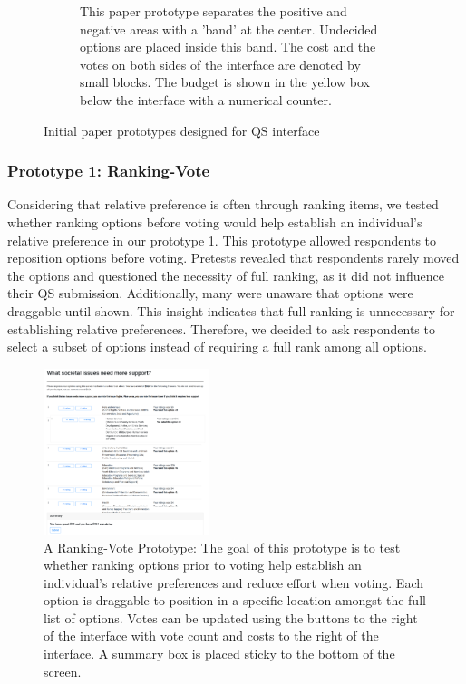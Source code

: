 \begin{figure}[H]
\begin{subfigure}[b]{0.42\textwidth}
        \caption{This paper prototype separates the positive and negative areas with a 'band' at the center. Undecided options are placed inside this band. The cost and the votes on both sides of the interface are denoted by small blocks. The budget is shown in the yellow box below the interface with a numerical counter.}
        \label{fig:vertical_paper}
    \end{subfigure}
    \caption{Initial paper prototypes designed for QS interface}
    \label{fig:qv_paper}
\end{figure}

\subsubsection{Prototype 1: Ranking-Vote}
Considering that relative preference is often through ranking items, we tested whether ranking options before voting would help establish an individual's relative preference in our prototype 1. This prototype allowed respondents to reposition options before voting. Pretests revealed that respondents rarely moved the options and questioned the necessity of full ranking, as it did not influence their QS submission. Additionally, many were unaware that options were draggable until shown. This insight indicates that full ranking is unnecessary for establishing relative preferences. Therefore, we decided to ask respondents to select a subset of options instead of requiring a full rank among all options.

\begin{figure}[h]
    \centering
    \includegraphics[width=0.43\textwidth]{content/image/prototypes/2_ranking.png}
    \caption{A Ranking-Vote Prototype: The goal of this prototype is to test whether ranking options prior to voting help establish an individual's relative preferences and reduce effort when voting. Each option is draggable to position in a specific location amongst the full list of options. Votes can be updated using the buttons to the right of the interface with vote count and costs to the right of the interface. A summary box is placed sticky to the bottom of the screen.}
    \label{fig:qv_rank}
\end{figure}

